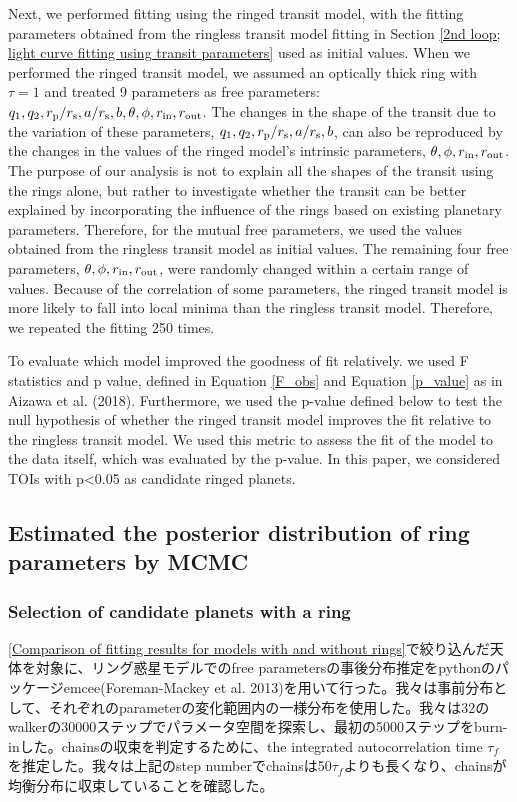 \documentclass[fleqn,usenatbib, onecolumn,dvipdfmx]{mnras}
\begin{document}
Next, we performed fitting using the ringed transit model, with the fitting parameters obtained from the ringless transit model fitting in Section \ref{2nd loop; light curve fitting using transit parameters} used as initial values. When we performed the ringed transit model, we assumed an optically thick ring with $\tau=1$ and treated 9 parameters as free parameters: $q_1, q_2, r_{\rm{p}}/r_{\rm{s}}, a/r_{\rm{s}}, b, \theta, \phi, r_{\rm{in}}, r_{\rm{out}}$.
The changes in the shape of the transit due to the variation of these parameters, $q_1, q_2, r_{\rm{p}}/r_{\rm{s}}, a/r_{\rm{s}}, b$, can also be reproduced by the changes in the values of the ringed model's intrinsic parameters, $\theta, \phi, r_{\rm{in}}, r_{\rm{out}}$. The purpose of our analysis is not to explain all the shapes of the transit using the rings alone, but rather to investigate whether the transit can be better explained by incorporating the influence of the rings based on existing planetary parameters. Therefore, for the mutual free parameters, we used the values obtained from the ringless transit model as initial values. The remaining four free parameters, $\theta, \phi, r_{\rm{in}}, r_{\rm{out}}$, were randomly changed within a certain range of values. Because of the correlation of some parameters, the ringed transit model is more likely to fall into local minima than the ringless transit model. Therefore, we repeated the fitting 250 times.

To evaluate which model improved the goodness of fit relatively. we used F statistics and p value, defined in Equation \ref{F_obs} and Equation \ref{p_value} as in Aizawa et al. (2018). Furthermore, we used the p-value defined below to test the null hypothesis of whether the ringed transit model improves the fit relative to the ringless transit model. We used this metric to assess the fit of the model to the data itself, which was evaluated by the p-value. In this paper, we considered TOIs with p<0.05 as candidate ringed planets.


\subsection{Estimated the posterior distribution of ring parameters by MCMC}\label{Estimated the posterior distribution of ring parameters by MCMC}
\subsubsection{Selection of candidate planets with a ring}\label{Selection of candidate planets with a ring}
\ref{Comparison of fitting results for models with and without rings}で絞り込んだ天体を対象に、リング惑星モデルでのfree parametersの事後分布推定をpythonのパッケージemcee(Foreman-Mackey et al. 2013)を用いて行った。我々は事前分布として、それぞれのparameterの変化範囲内の一様分布を使用した。我々は32のwalkerの30000ステップでパラメータ空間を探索し、最初の5000ステップをburn-inした。chainsの収束を判定するために、the integrated autocorrelation time $\tau_{f}$を推定した。我々は上記のstep numberでchainsは50$\tau_{f}$よりも長くなり、chainsが均衡分布に収束していることを確認した。
\end{document}
